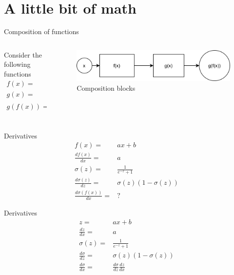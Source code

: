 \section{A little bit of math}

\begin{frame}{Composition of functions} 
	\begin{columns}
		\begin{column}{.5\textwidth}
			Consider the following  functions 
			\begin{align*}
				f(x)=& ax+b \\
				g(x)=&  \frac{1}{e^{-x}+1} \\
				g(f(x)) =& \frac{1}{e^{-(ax+b)}+1} \\  
			\end{align*}
		\end{column}
		\begin{column}{.5\textwidth}
			\begin{figure}
				\includegraphics[width=.8\textwidth, center]{figures/function_composition}
				\caption*{Composition blocks}
			\end{figure}
		\end{column}
	\end{columns}
\end{frame}

\begin{frame}{Derivatives}
	\begin{align*}
		f(x)=&ax+b \\
		\frac{df(x)}{dx} =& a \\
		\sigma(z) =&\frac{1}{e^{-z}+1} \\
		\frac{d\sigma(z)}{dz} =& \sigma(z)(1-\sigma(z)) \\
		\frac{d\sigma(f(x))}{dx}=&?
	\end{align*}
\end{frame}

\begin{frame}{Derivatives}
	\begin{align*}
		z=&ax+b \\
		\frac{dz}{dx} =& a \\
		\sigma(z) =&\frac{1}{e^{-z}+1} \\
		\frac{d\sigma}{dz} =& \sigma(z)(1-\sigma(z)) \\
		\frac{d\sigma}{dx}=&\frac{d\sigma}{dz} \frac{dz}{dx} 
	\end{align*}
\end{frame}

